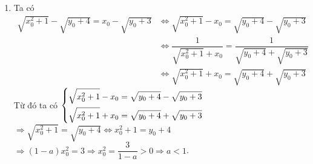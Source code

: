 \begin{ex}
{\begin{enumerate}
		\item  Ta có \\
		$\begin{aligned}
			\sqrt{x^2_0+1} - \sqrt{y_0+4} = x_0 - \sqrt{y_0+3}
			& \Leftrightarrow \sqrt{x^2_0+1} - x_0 = \sqrt{y_0+4} - \sqrt{y_0+3} \\
			& \Leftrightarrow \dfrac{1}{\sqrt{x^2_0+1} + x_0} = \dfrac{1}{\sqrt{y_0+4} + \sqrt{y_0+3}}\\
			& \Leftrightarrow \sqrt{x^2_0+1} + x_0 = \sqrt{y_0+4} + \sqrt{y_0+3}
		\end{aligned}$\\
		Từ đó ta có $\left\{\begin{aligned}&\sqrt{x^2_0+1}-x_0=\sqrt{y_0+4} - \sqrt{y_0+3}\\ &\sqrt{x^2_0+1} + x_0 = \sqrt{y_0+4} + \sqrt{y_0+3}\end{aligned}\right.$\\
		$ \Rightarrow \sqrt{x^2_0+1} = \sqrt{y_0+4} \Leftrightarrow x^2_0+1 = y_0 +4$\\
		$ \Rightarrow (1-a)x^2_0=3 \Rightarrow x^2_0 = \dfrac{3}{1-a}>0 \Rightarrow a<1 $.
	\end{enumerate}}
\end{ex}

